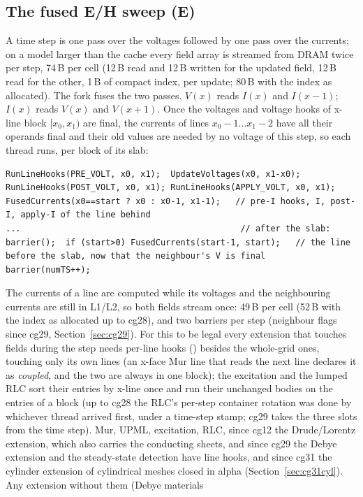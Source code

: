 \subsection{The fused E/H sweep (E)}\label{sec:fused}
A time step is one pass over the voltages followed by one pass over the currents; on a model larger than the cache
every field array is streamed from DRAM twice per step, 74\,B per cell (12\,B read and 12\,B written for the updated
field, 12\,B read for the other, 1\,B of compact index, per update; 80\,B with the index as allocated). The fork
fuses the two passes. $V(x)$ reads $I(x)$ and $I(x-1)$; $I(x)$ reads $V(x)$ and $V(x+1)$. Once the voltages and
voltage hooks of x-line block $[x_0,x_1)$ are final, the currents of lines $x_0-1 \ldots x_1-2$ have all their
operands final and their old values are needed by no voltage of this step, so each thread runs, per block of its slab:
\begin{lstlisting}
RunLineHooks(PRE_VOLT, x0, x1);  UpdateVoltages(x0, x1-x0);
RunLineHooks(POST_VOLT, x0, x1); RunLineHooks(APPLY_VOLT, x0, x1);
FusedCurrents(x0==start ? x0 : x0-1, x1-1);   // pre-I hooks, I, post-I, apply-I of the line behind
...                                            // after the slab:
barrier();  if (start>0) FusedCurrents(start-1, start);   // the line before the slab, now that the neighbour's V is final
barrier(numTS++);
\end{lstlisting}
The currents of a line are computed while its voltages and the neighbouring currents are still in L1/L2, so both
fields stream once: 49\,B per cell (52\,B with the index as allocated up to cg28), and two barriers per step (neighbour
flags since cg29, Section~\ref{sec:cg29}). For this to be
legal every extension that touches fields during the step needs per-line hooks () besides the
whole-grid ones, touching only its own lines (an x-face Mur line that reads the next line declares it as
\emph{coupled}, and the two are always in one block); the excitation and the lumped RLC sort their entries by x-line
once and run their unchanged bodies on the entries of a block (up to cg28 the RLC's per-step container rotation was
done by whichever thread arrived first, under a time-step stamp; cg29 takes the three slots from the time step). Mur,
UPML, excitation, RLC, since cg12 the Drude/Lorentz extension, which also carries the conducting sheets, and since
cg29 the Debye extension and the steady-state detection have line hooks, and since cg31 the cylinder extension of
cylindrical meshes closed in alpha (Section~\ref{sec:cg31cyl}). Any extension without them (Debye materials
